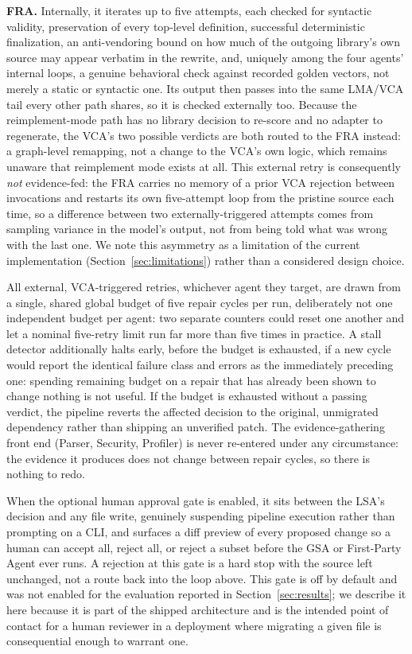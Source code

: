 \textbf{FRA.} Internally, it iterates up to five attempts, each checked for syntactic validity, preservation of every top-level definition, successful deterministic finalization, an anti-vendoring bound on how much of the outgoing library's own source may appear verbatim in the rewrite, and, uniquely among the four agents' internal loops, a genuine behavioral check against recorded golden vectors, not merely a static or syntactic one. Its output then passes into the same LMA/VCA tail every other path shares, so it is checked externally too. Because the reimplement-mode path has no library decision to re-score and no adapter to regenerate, the VCA's two possible verdicts are both routed to the FRA instead: a graph-level remapping, not a change to the VCA's own logic, which remains unaware that reimplement mode exists at all. This external retry is consequently \emph{not} evidence-fed: the FRA carries no memory of a prior VCA rejection between invocations and restarts its own five-attempt loop from the pristine source each time, so a difference between two externally-triggered attempts comes from sampling variance in the model's output, not from being told what was wrong with the last one. We note this asymmetry as a limitation of the current implementation (Section~\ref{sec:limitations}) rather than a considered design choice.

All external, VCA-triggered retries, whichever agent they target, are drawn from a single, shared global budget of five repair cycles per run, deliberately not one independent budget per agent: two separate counters could reset one another and let a nominal five-retry limit run far more than five times in practice. A stall detector additionally halts early, before the budget is exhausted, if a new cycle would report the identical failure class and errors as the immediately preceding one: spending remaining budget on a repair that has already been shown to change nothing is not useful. If the budget is exhausted without a passing verdict, the pipeline reverts the affected decision to the original, unmigrated dependency rather than shipping an unverified patch. The evidence-gathering front end (Parser, Security, Profiler) is never re-entered under any circumstance: the evidence it produces does not change between repair cycles, so there is nothing to redo.

When the optional human approval gate is enabled, it sits between the LSA's decision and any file write, genuinely suspending pipeline execution rather than prompting on a CLI, and surfaces a diff preview of every proposed change so a human can accept all, reject all, or reject a subset before the GSA or First-Party Agent ever runs. A rejection at this gate is a hard stop with the source left unchanged, not a route back into the loop above. This gate is off by default and was not enabled for the evaluation reported in Section~\ref{sec:results}; we describe it here because it is part of the shipped architecture and is the intended point of contact for a human reviewer in a deployment where migrating a given file is consequential enough to warrant one.

